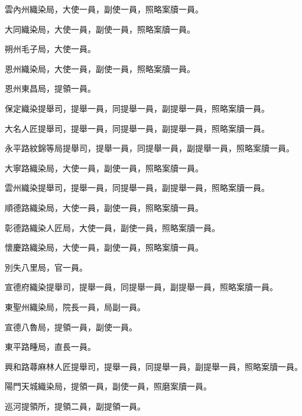 \begin{pinyinscope}
 雲內州織染局，大使一員，副使一員，照略案牘一員。



 大同織染局，大使一員，副使一員，照略案牘一員。



 朔州毛子局，大使一員。



 恩州織染局，大使一員，副使一員，照略案牘一員。



 恩州東昌局，提領一員。



 保定織染提舉司，提舉一員，同提舉一員，副提舉一員，照略案牘一員。



 大名人匠提舉司，提舉一員，同提舉一員，副提舉一員，照略案牘一員。



 永平路紋錦等局提舉司，提舉一員，同提舉一員，副提舉一員，照略案牘一員。



 大寧路織染局，大使一員，副使一員，照略案牘一員。



 雲州織染提舉司，提舉一員，同提舉一員，副提舉一員，照略案牘一員。



 順德路織染局，大使一員，副使一員，照略案牘一員。



 彰德路織染人匠局，大使一員，副使一員，照略案牘一員。



 懷慶路織染局，大使一員，副使一員，照略案牘一員。



 別失八里局，官一員。



 宣德府織染提舉司，提舉一員，同提舉一員，副提舉一員，照略案牘一員。



 東聖州織染局，院長一員，局副一員。



 宣德八魯局，提領一員，副使一員。



 東平路畽局，直長一員。



 興和路蕁麻林人匠提舉司，提舉一員，同提舉一員，副提舉一員，照略案牘一員。



 陽門天城織染局，提領一員，副使一員，照磨案牘一員。



 巡河提領所，提領二員，副提領一員。



\end{pinyinscope}
